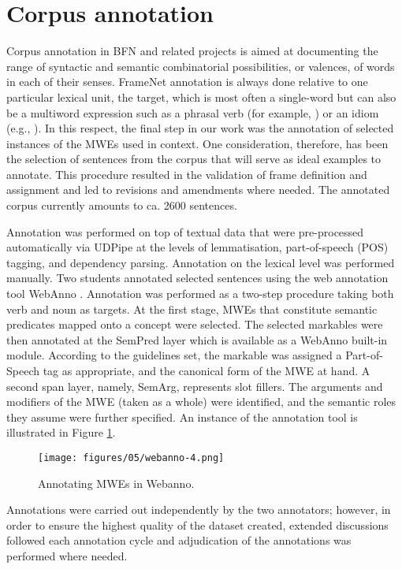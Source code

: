 \documentclass[output=paper,colorlinks,citecolor=brown]{langscibook}
\begin{document}
\section{Corpus annotation}
\label{sec:05-annotation}
Corpus annotation in BFN and related projects is aimed at documenting the range of syntactic and semantic combinatorial possibilities, or valences, of words in each of their senses. FrameNet annotation is always done relative to one particular lexical unit, the target, which is most often a single-word but can also be a multiword expression such as a phrasal verb (for example, ) or an idiom (e.g., ). In this respect, the final step in our work was the annotation of selected instances of the MWEs used in context. One consideration, therefore, has been the selection of sentences from the corpus that will serve as ideal examples to annotate. This procedure resulted in the validation of frame definition and assignment and led to revisions and amendments where needed. The annotated corpus currently amounts to ca. 2600 sentences. 

Annotation was performed on top of textual data that were pre-processed automatically via UDPipe \citep{straka_strakova_2017} at the levels of lemmatisation, part-of-speech (POS) tagging, and dependency parsing. Annotation on the lexical level was performed manually. Two students annotated selected sentences using the web annotation tool WebAnno \citep{yimam_etal_2013}. Annotation was performed as a two-step procedure taking both verb and noun as targets. At the first stage, MWEs that constitute semantic predicates mapped onto a concept were selected. The selected markables were then annotated at the SemPred layer which is available as a WebAnno built-in module. According to the guidelines set, the markable was assigned a Part-of-Speech tag as appropriate, and the canonical form of the MWE at hand. A second span layer, namely, SemArg, represents slot fillers. The arguments and modifiers of the MWE (taken as a whole) were identified, and the semantic roles they assume were further specified. An instance of the annotation tool is illustrated in Figure \ref{fig:webanno}.

\begin{figure}
    \texttt{[image: figures/05/webanno-4.png]}
    \caption{Annotating MWEs in Webanno.}
    \label{fig:webanno}
\end{figure}

Annotations were carried out independently by the two annotators; however, in order to ensure the highest quality of the dataset created, extended discussions followed each annotation cycle and adjudication of the annotations was performed where needed.
\end{document}
